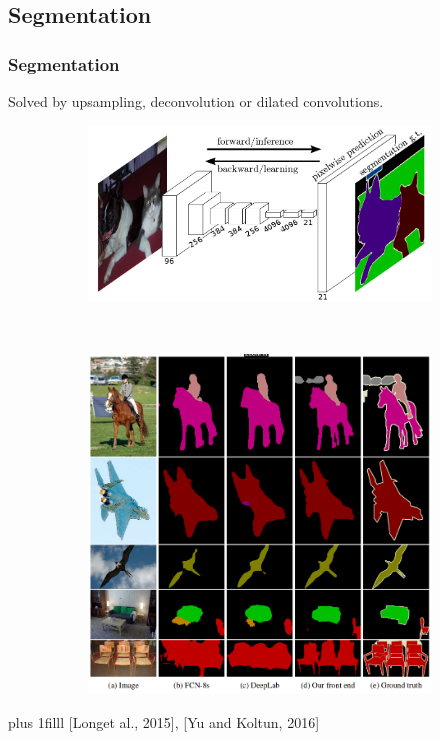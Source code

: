 \documentclass{beamer}
\newcommand{\source}[1]{\vskip0pt plus 1filll \scriptsize #1}
\begin{document}
	\subsection[Segmentation]{Segmentation}
	\begin{frame}
		\frametitle{Segmentation}
		Solved by upsampling, deconvolution or dilated convolutions.
		\begin{figure}[h]
			\centering
			\begin{subfigure}{0.45\textwidth}
				\includegraphics[width=\textwidth]{plots/fcn.png}
			\end{subfigure}
			~
			\begin{subfigure}{0.5\textwidth}
				\includegraphics[width=\textwidth]{plots/segmentationComparison.png}
			\end{subfigure}
		\end{figure}
		\source{[Longet al., 2015], [Yu and Koltun, 2016]}
	\end{frame}
\end{document}
